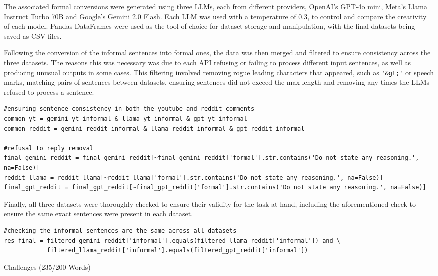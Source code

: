 \documentclass[a4paper,9pt]{scrartcl}
\makeatletter
\renewcommand{\subsection}{\@startsection{subsection}{2}{0mm}
  {0.25\baselineskip} 
  {0.25\baselineskip} 
  {\normalfont\normalsize\bfseries}}
\makeatother
\begin{document}
The associated formal conversions were generated using three LLMs, each from different providers, OpenAI's 
GPT-4o mini, Meta's Llama Instruct Turbo 70B and Google's Gemini 2.0 Flash. Each LLM was used with a 
temperature of 0.3, to control and compare the creativity of each model. Pandas DataFrames were used as the
tool of choice for dataset storage and manipulation, with the final datasets being saved as CSV files.

Following the conversion of the informal sentences into formal ones, the data was then merged and filtered
to ensure consistency across the three datasets. The reasons this was necessary was due to each API refusing 
or failing to process different input sentences, as well as producing unusual outputs in some cases. This 
filtering involved removing rogue leading characters that appeared, such as \verb|'&gt;'| or speech marks,
matching pairs of sentences between datasets, ensuring sentences did not exceed the max length and removing 
any times the LLMs refused to process a sentence.

\begin{lstlisting}
#ensuring sentence consistency in both the youtube and reddit comments
common_yt = gemini_yt_informal & llama_yt_informal & gpt_yt_informal
common_reddit = gemini_reddit_informal & llama_reddit_informal & gpt_reddit_informal

#refusal to reply removal
final_gemini_reddit = final_gemini_reddit[~final_gemini_reddit['formal'].str.contains('Do not state any reasoning.', na=False)]
reddit_llama = reddit_llama[~reddit_llama['formal'].str.contains('Do not state any reasoning.', na=False)]
final_gpt_reddit = final_gpt_reddit[~final_gpt_reddit['formal'].str.contains('Do not state any reasoning.', na=False)]
\end{lstlisting}

Finally, all three datasets were thoroughly checked to ensure their validity for the task at hand, including
the aforementioned check to ensure the same exact sentences were present in each dataset. 

\begin{lstlisting}
#checking the informal sentences are the same across all datasets
res_final = filtered_gemini_reddit['informal'].equals(filtered_llama_reddit['informal']) and \
            filtered_llama_reddit['informal'].equals(filtered_gpt_reddit['informal'])
\end{lstlisting}



\subsection{Challenges (235/200 Words)}
\end{document}
